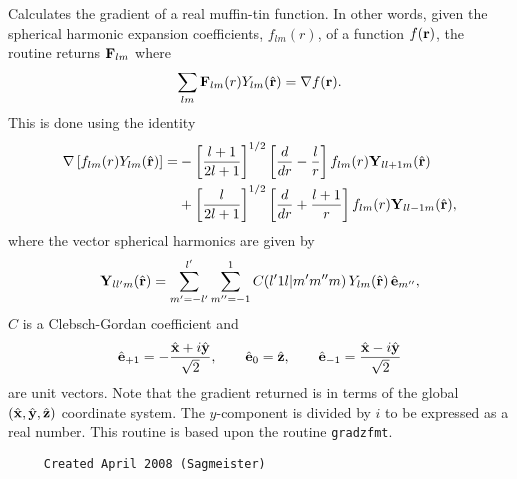 \documentclass[11pt]{article}
\begin{document}
     Calculates the gradient of a real muffin-tin function. In other words,
     given the spherical harmonic expansion coefficients, $f_{lm}(r)$, of a
     function $f({\bf r})$, the routine returns ${\bf F}_{lm}$ where
     $$ \sum_{lm}{\bf F}_{lm}(r)Y_{lm}(\hat{\bf r})=\nabla f({\bf r}). $$
     This is done using the identity
     \begin{align*}
      \nabla\left[f_{lm}(r)Y_{lm}(\hat{\bf r})\right]=&-\left[\frac{l+1}{2l+1}
      \right]^{1/2}\left[\frac{d}{dr}-\frac{l}{r}\right]f_{lm}(r)
      {\bf Y}_{ll+1m}(\hat{\bf r})\\
      &+\left[\frac{l}{2l+1}\right]^{1/2}\left[\frac{d}{dr}+\frac{l+1}{r}\right]
      f_{lm}(r){\bf Y}_{ll-1m}(\hat{\bf r}),
     \end{align*}
     where the vector spherical harmonics are given by
     $$ {\bf Y}_{ll'm}(\hat{\bf r})=\sum_{m'=-l'}^{l'}\sum_{m''=-1}^1
      C(l'1l|m'm''m)\,Y_{lm}(\hat{\bf r})\,\hat{\bf e}_{m''}, $$
     $C$ is a Clebsch-Gordan coefficient and
     $$ \hat{\bf e}_{+1}=-\frac{\hat{\bf x}+i\hat{\bf y}}{\sqrt{2}},\quad\quad
      \hat{\bf e}_0=\hat{\bf z},\quad\quad \hat{\bf e}_{-1}=\frac{\hat{\bf x}-
      i\hat{\bf y}}{\sqrt{2}} $$
     are unit vectors. Note that the gradient returned is in terms of the global
     $(\hat{\bf x},\hat{\bf y},\hat{\bf z})$ coordinate system. The $y$-component
     is divided by $i$ to be expressed as a real number. This routine is based
     upon the routine {\tt gradzfmt}.
  
\begin{verbatim}     Created April 2008 (Sagmeister)\end{verbatim}













\end{document}
